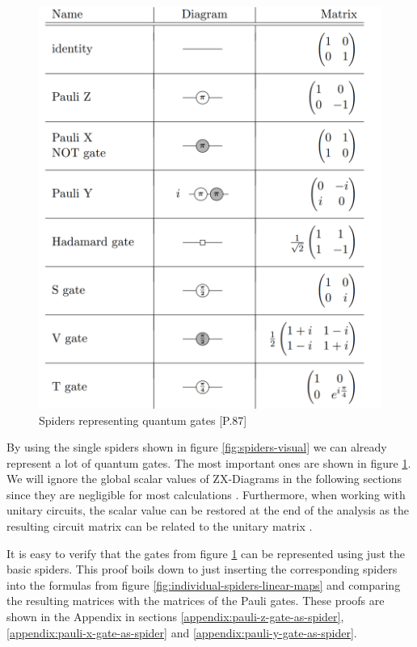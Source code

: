 \begin{figure}[h]
    \includegraphics[width=\linewidth]{images/single_spider_unitaries.png}
    \caption{Spiders representing quantum gates
            {\cite{vandewetering2020zxcalculus}[P.87]}}
    \label{fig:spiders-gate-representation}
\end{figure}

By using the single spiders shown in figure \ref{fig:spiders-visual} we can already represent a lot of quantum gates. The most important ones are shown in figure \ref{fig:spiders-gate-representation}. We will ignore the global scalar values of ZX-Diagrams in the following sections since they are negligible for most calculations \cite{equivalence_checking_tum}. Furthermore, when working with unitary circuits, the scalar value can be restored at the end of the analysis as the resulting circuit matrix can be related to the unitary matrix \cite{vandewetering2020zxcalculus}.

It is easy to verify that the gates from figure \ref{fig:spiders-gate-representation} can be represented using just the basic spiders. This proof boils down to just inserting the corresponding spiders into the formulas from figure \ref{fig:individual-spiders-linear-maps} and comparing the resulting matrices with the matrices of the Pauli gates.
These proofs are shown in the Appendix in sections \ref{appendix:pauli-z-gate-as-spider}, \ref{appendix:pauli-x-gate-as-spider} and \ref{appendix:pauli-y-gate-as-spider}.


